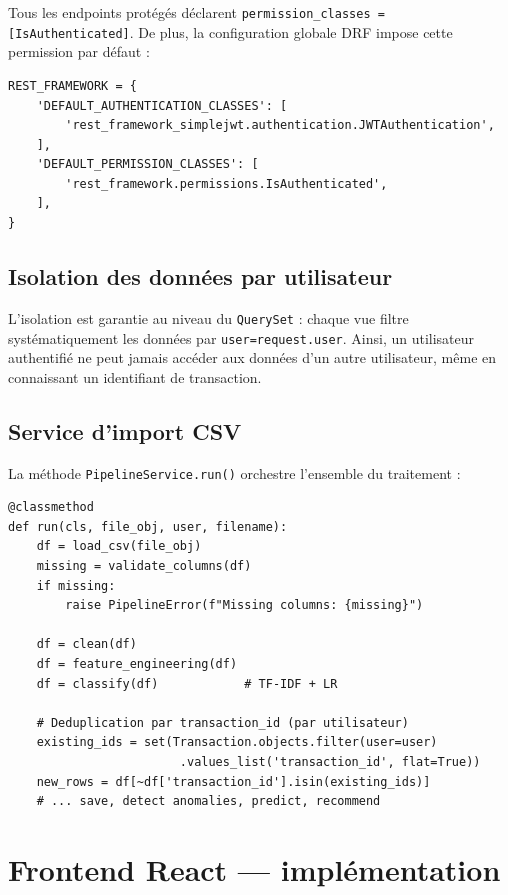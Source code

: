 \documentclass[12pt,a4paper]{report}
\begin{document}
Tous les endpoints protégés déclarent \texttt{permission\_classes = [IsAuthenticated]}.
De plus, la configuration globale DRF impose cette permission par défaut :

\begin{lstlisting}[style=python, caption={Configuration DRF — permissions par défaut},
                   label={lst:drf-settings}]
REST_FRAMEWORK = {
    'DEFAULT_AUTHENTICATION_CLASSES': [
        'rest_framework_simplejwt.authentication.JWTAuthentication',
    ],
    'DEFAULT_PERMISSION_CLASSES': [
        'rest_framework.permissions.IsAuthenticated',
    ],
}
\end{lstlisting}

\subsection{Isolation des données par utilisateur}

L'isolation est garantie au niveau du \texttt{QuerySet} : chaque vue filtre
systématiquement les données par \texttt{user=request.user}. Ainsi, un
utilisateur authentifié ne peut jamais accéder aux données d'un autre
utilisateur, même en connaissant un identifiant de transaction.

\subsection{Service d'import CSV}

La méthode \texttt{PipelineService.run()} orchestre l'ensemble du traitement :

\begin{lstlisting}[style=python, caption={Extrait de PipelineService.run()},
                   label={lst:pipeline-service}]
@classmethod
def run(cls, file_obj, user, filename):
    df = load_csv(file_obj)
    missing = validate_columns(df)
    if missing:
        raise PipelineError(f"Missing columns: {missing}")

    df = clean(df)
    df = feature_engineering(df)
    df = classify(df)            # TF-IDF + LR

    # Deduplication par transaction_id (par utilisateur)
    existing_ids = set(Transaction.objects.filter(user=user)
                        .values_list('transaction_id', flat=True))
    new_rows = df[~df['transaction_id'].isin(existing_ids)]
    # ... save, detect anomalies, predict, recommend
\end{lstlisting}

\section{Frontend React — implémentation}
\end{document}

